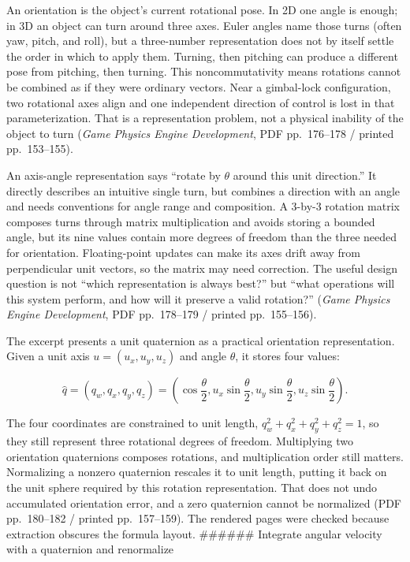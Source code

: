 An orientation is the object's current rotational pose. In 2D one angle is enough; in 3D an object can turn around three axes. Euler angles name those turns (often yaw, pitch, and roll), but a three-number representation does not by itself settle the order in which to apply them. Turning, then pitching can produce a different pose from pitching, then turning. This noncommutativity means rotations cannot be combined as if they were ordinary vectors. Near a gimbal-lock configuration, two rotational axes align and one independent direction of control is lost in that parameterization. That is a representation problem, not a physical inability of the object to turn (\emph{Game Physics Engine Development}, PDF pp.~176--178 / printed pp.~153--155).

An axis-angle representation says ``rotate by \(\theta\) around this unit direction.'' It directly describes an intuitive single turn, but combines a direction with an angle and needs conventions for angle range and composition. A 3-by-3 rotation matrix composes turns through matrix multiplication and avoids storing a bounded angle, but its nine values contain more degrees of freedom than the three needed for orientation. Floating-point updates can make its axes drift away from perpendicular unit vectors, so the matrix may need correction. The useful design question is not ``which representation is always best?'' but ``what operations will this system perform, and how will it preserve a valid rotation?'' (\emph{Game Physics Engine Development}, PDF pp.~178--179 / printed pp.~155--156).

The excerpt presents a unit quaternion as a practical orientation representation. Given a unit axis \(u=(u_x,u_y,u_z)\) and angle \(\theta\), it stores four values:

\[
\hat q = (q_w,q_x,q_y,q_z) = \left(\cos\frac{\theta}{2},
 u_x\sin\frac{\theta}{2},
 u_y\sin\frac{\theta}{2},
 u_z\sin\frac{\theta}{2}\right).
\]

The four coordinates are constrained to unit length, \(q_w^2+q_x^2+q_y^2+q_z^2=1\), so they still represent three rotational degrees of freedom. Multiplying two orientation quaternions composes rotations, and multiplication order still matters. Normalizing a nonzero quaternion rescales it to unit length, putting it back on the unit sphere required by this rotation representation. That does not undo accumulated orientation error, and a zero quaternion cannot be normalized (PDF pp.~180--182 / printed pp.~157--159). The rendered pages were checked because extraction obscures the formula layout. \#\#\#\#\#\# Integrate angular velocity with a quaternion and renormalize

